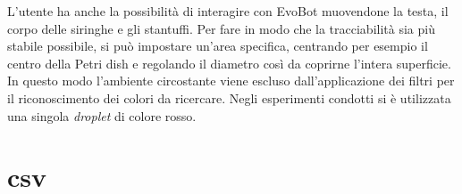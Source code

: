 L'utente ha anche la possibilità di interagire con EvoBot muovendone la testa, il corpo delle siringhe e gli stantuffi.
Per fare in modo che la tracciabilità sia più stabile possibile, si può impostare un'area specifica, centrando per esempio il centro della Petri dish e regolando il diametro così da coprirne l'intera superficie. In questo modo l'ambiente circostante viene escluso dall'applicazione dei filtri per il riconoscimento dei colori da ricercare. 
Negli esperimenti condotti si è utilizzata una singola  \emph{droplet} di colore rosso. 




\subsection{}
\label{sec:00456}

\section{csv}
\label{sec:123}



